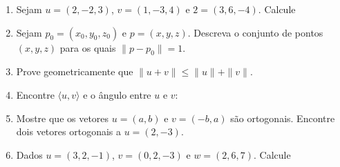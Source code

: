 \documentclass[a4paper,5pt]{amsbook}
\newcommand{\ds}{\displaystyle}
\begin{document}
\begin{enumerate}
	\vspace{0.5cm}
	\item Sejam $u=(2,-2,3)$, $v=(1,-3,4)$ e $2=(3,6,-4)$. Calcule


	\vspace{0.5cm}
	\item Sejam $p_0=(x_0,y_0,z_0)$ e $p=(x,y,z)$. Descreva o conjunto de
		pontos $(x,y,z)$ para os quais $\|p-p_0\|=1$.

	\vspace{0.5cm}
	\item Prove geometricamente que $\|u+v\|\le\|u\|+\|v\|$.

	\vspace{0.5cm}
	\item Encontre $\langle u, v \rangle$ e o \^angulo entre $u$ e $v$:


	\vspace{0.5cm}
	\item Mostre que os vetores $u=(a,b)$ e $v=(-b,a)$ s\~ao ortogonais. Encontre
		dois vetores ortogonais a $u=(2,-3)$. 

	\vspace{0.5cm}
	\item Dados $u=(3,2,-1)$, $v=(0,2,-3)$ e $w=(2,6,7)$. Calcule



\end{enumerate}
\end{document}
